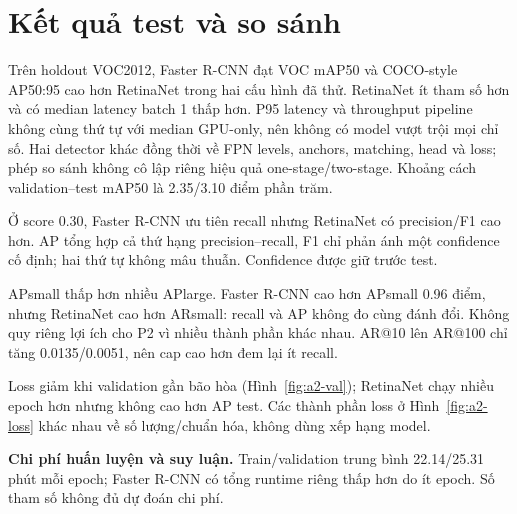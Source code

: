 \section{Kết quả test và so sánh}
Trên holdout VOC2012, Faster R-CNN đạt VOC mAP50 và COCO-style AP50:95
cao hơn RetinaNet trong hai cấu hình đã thử. RetinaNet ít tham số hơn và có
median latency batch 1 thấp hơn. P95 latency và throughput pipeline không
cùng thứ tự với median GPU-only, nên không có model vượt trội mọi chỉ số.
Hai detector khác đồng thời về FPN levels, anchors, matching, head và loss;
phép so sánh không cô lập riêng hiệu quả one-stage/two-stage.
Khoảng cách validation--test mAP50 là 2.35/3.10 điểm phần trăm.

Ở score 0.30, Faster R-CNN ưu tiên recall nhưng RetinaNet có precision/F1
cao hơn. AP tổng hợp cả thứ hạng precision--recall, F1 chỉ phản ánh một
confidence cố định; hai thứ tự không mâu thuẫn. Confidence được giữ trước test.

APsmall thấp hơn nhiều APlarge. Faster R-CNN cao hơn APsmall 0.96 điểm,
nhưng RetinaNet cao hơn ARsmall: recall và AP không đo cùng đánh đổi.
Không quy riêng lợi ích cho P2 vì nhiều thành phần khác nhau.
AR@10 lên AR@100 chỉ tăng 0.0135/0.0051, nên cap cao hơn đem lại ít recall.


Loss giảm khi validation gần bão hòa (Hình~\ref{fig:a2-val}); RetinaNet chạy
nhiều epoch hơn nhưng không cao hơn AP test. Các thành phần loss ở
Hình~\ref{fig:a2-loss} khác nhau về số lượng/chuẩn hóa, không dùng xếp hạng model.



\Needspace{.30\textheight}
\noindent\textbf{Chi phí huấn luyện và suy luận.}
Train/validation trung bình 22.14/25.31 phút mỗi epoch; Faster R-CNN có
tổng runtime riêng thấp hơn do ít epoch. Số tham số không đủ dự đoán chi phí.

